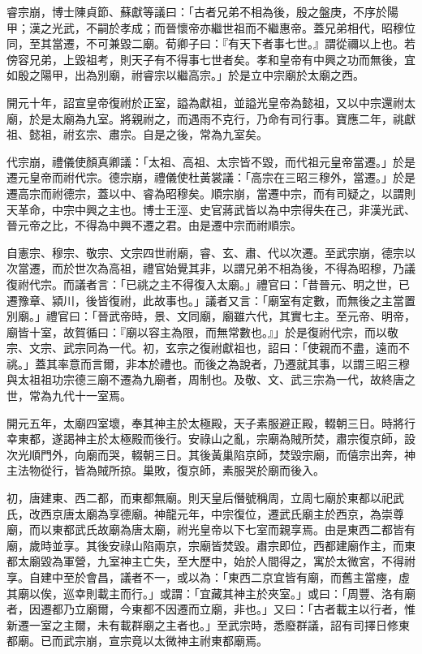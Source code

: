 \begin{pinyinscope}
 睿宗崩，博士陳貞節、蘇獻等議曰：「古者兄弟不相為後，殷之盤庚，不序於陽甲；漢之光武，不嗣於孝成；而晉懷帝亦繼世祖而不繼惠帝。蓋兄弟相代，昭穆位同，至其當遷，不可兼毀二廟。荀卿子曰：『有天下者事七世。』謂從禰以上也。若傍容兄弟，上毀祖考，則天子有不得事七世者矣。孝和皇帝有中興之功而無後，宜如殷之陽甲，出為別廟，祔睿宗以繼高宗。」於是立中宗廟於太廟之西。



 開元十年，詔宣皇帝復祔於正室，謚為獻祖，並謚光皇帝為懿祖，又以中宗還祔太廟，於是太廟為九室。將親祔之，而遇雨不克行，乃命有司行事。寶應二年，祧獻祖、懿祖，祔玄宗、肅宗。自是之後，常為九室矣。



 代宗崩，禮儀使顏真卿議：「太祖、高祖、太宗皆不毀，而代祖元皇帝當遷。」於是遷元皇帝而祔代宗。德宗崩，禮儀使杜黃裳議：「高宗在三昭三穆外，當遷。」於是遷高宗而祔德宗，蓋以中、睿為昭穆矣。順宗崩，當遷中宗，而有司疑之，以謂則天革命，中宗中興之主也。博士王涇、史官蔣武皆以為中宗得失在己，非漢光武、晉元帝之比，不得為中興不遷之君。由是遷中宗而祔順宗。



 自憲宗、穆宗、敬宗、文宗四世祔廟，睿、玄、肅、代以次遷。至武宗崩，德宗以次當遷，而於世次為高祖，禮官始覺其非，以謂兄弟不相為後，不得為昭穆，乃議復祔代宗。而議者言：「已祧之主不得復入太廟。」禮官曰：「昔晉元、明之世，已遷豫章、潁川，後皆復祔，此故事也。」議者又言：「廟室有定數，而無後之主當置別廟。」禮官曰：「晉武帝時，景、文同廟，廟雖六代，其實七主。至元帝、明帝，廟皆十室，故賀循曰：『廟以容主為限，而無常數也。』」於是復祔代宗，而以敬宗、文宗、武宗同為一代。初，玄宗之復祔獻祖也，詔曰：「使親而不盡，遠而不祧。」蓋其率意而言爾，非本於禮也。而後之為說者，乃遷就其事，以謂三昭三穆與太祖祖功宗德三廟不遷為九廟者，周制也。及敬、文、武三宗為一代，故終唐之世，常為九代十一室焉。



 開元五年，太廟四室壞，奉其神主於太極殿，天子素服避正殿，輟朝三日。時將行幸東都，遂謁神主於太極殿而後行。安祿山之亂，宗廟為賊所焚，肅宗復京師，設次光順門外，向廟而哭，輟朝三日。其後黃巢陷京師，焚毀宗廟，而僖宗出奔，神主法物從行，皆為賊所掠。巢敗，復京師，素服哭於廟而後入。



 初，唐建東、西二都，而東都無廟。則天皇后僭號稱周，立周七廟於東都以祀武氏，改西京唐太廟為享德廟。神龍元年，中宗復位，遷武氏廟主於西京，為崇尊廟，而以東都武氏故廟為唐太廟，祔光皇帝以下七室而親享焉。由是東西二都皆有廟，歲時並享。其後安祿山陷兩京，宗廟皆焚毀。肅宗即位，西都建廟作主，而東都太廟毀為軍營，九室神主亡失，至大歷中，始於人間得之，寓於太微宮，不得祔享。自建中至於會昌，議者不一，或以為：「東西二京宜皆有廟，而舊主當瘞，虛其廟以俟，巡幸則載主而行。」或謂：「宜藏其神主於夾室。」或曰：「周豐、洛有廟者，因遷都乃立廟爾，今東都不因遷而立廟，非也。」又曰：「古者載主以行者，惟新遷一室之主爾，未有載群廟之主者也。」至武宗時，悉廢群議，詔有司擇日修東都廟。已而武宗崩，宣宗竟以太微神主祔東都廟焉。




\end{pinyinscope}
